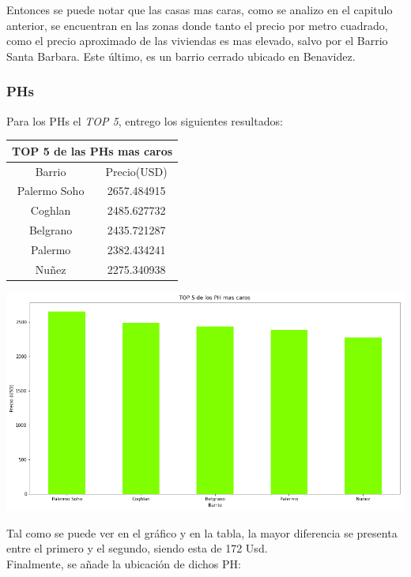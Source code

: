 \documentclass[a4paper, 10pt]{article}
\begin{document}
				Entonces se puede notar que las casas mas caras, como se analizo en el capitulo anterior, se encuentran en las zonas donde tanto el precio por metro cuadrado, como el precio aproximado de las viviendas es mas elevado, salvo por el Barrio Santa Barbara. Este último, es un barrio cerrado ubicado en Benavidez.


				\subsubsection{PHs}
				Para los PHs el \emph{TOP 5}, entrego los siguientes resultados:

					\begin{center}
						\begin{tabular}{ |c|c| }
							\hline
							\multicolumn{2}{|c|}{TOP 5 de las PHs mas caros}\\
							\hline
							\hline
							Barrio & Precio(USD)\\
							\hline
							Palermo Soho & 2657.484915 \\
							Coghlan & 2485.627732 \\
							Belgrano & 2435.721287 \\
							Palermo & 2382.434241 \\
							Nuñez & 2275.340938 \\
							\hline
						\end{tabular}
					\end{center}

				\begin{center}
   		    				\includegraphics[width=\textwidth]{images/topPHc}
				\end{center}

				Tal como se puede ver en el gráfico y en la tabla, la mayor diferencia se presenta entre el primero y el segundo, siendo esta de 172 Usd.\\
				Finalmente, se añade la ubicación de dichos PH:
\end{document}
